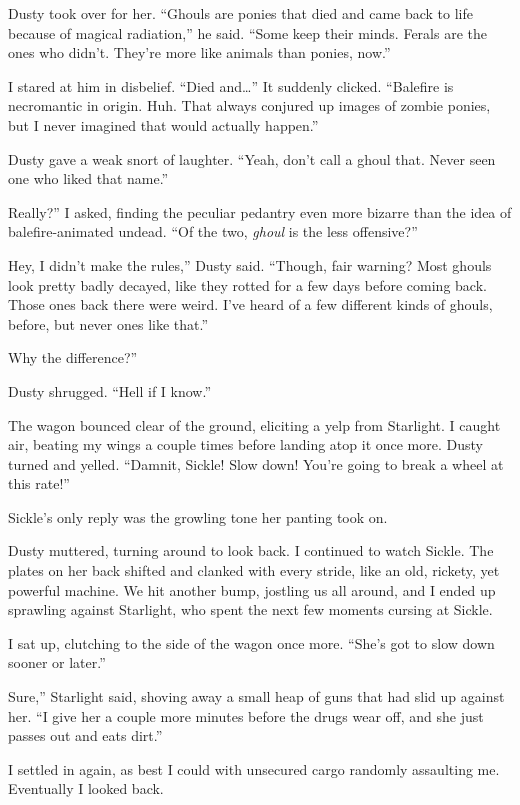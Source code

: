 Dusty took over for her. “Ghouls are ponies that died and came back to life because of magical radiation,” he said. “Some keep their minds. Ferals are the ones who didn’t. They’re more like animals than ponies, now.”

I stared at him in disbelief. “Died and…” It suddenly clicked. “Balefire is necromantic in origin. Huh. That always conjured up images of zombie ponies, but I never imagined that would actually happen.”

Dusty gave a weak snort of laughter. “Yeah, don’t call a ghoul that. Never seen one who liked that name.”

\leavevmode{}Really?” I asked, finding the peculiar pedantry even more bizarre than the idea of balefire-animated undead. “Of the two, \textit{ghoul} is the less offensive?”

\leavevmode{}Hey, I didn’t make the rules,” Dusty said. “Though, fair warning? Most ghouls look pretty badly decayed, like they rotted for a few days before coming back. Those ones back there were weird. I’ve heard of a few different kinds of ghouls, before, but never ones like that.”

\leavevmode{}Why the difference?”

Dusty shrugged. “Hell if I know.”

The wagon bounced clear of the ground, eliciting a yelp from Starlight. I caught air, beating my wings a couple times before landing atop it once more. Dusty turned and yelled. “Damnit, Sickle! Slow down! You’re going to break a wheel at this rate!”

Sickle’s only reply was the growling tone her panting took on.

Dusty muttered, turning around to look back. I continued to watch Sickle. The plates on her back shifted and clanked with every stride, like an old, rickety, yet powerful machine. We hit another bump, jostling us all around, and I ended up sprawling against Starlight, who spent the next few moments cursing at Sickle.

I sat up, clutching to the side of the wagon once more. “She’s got to slow down sooner or later.”

\leavevmode{}Sure,” Starlight said, shoving away a small heap of guns that had slid up against her. “I give her a couple more minutes before the drugs wear off, and she just passes out and eats dirt.”

I settled in again, as best I could with unsecured cargo randomly assaulting me. Eventually I looked back.

